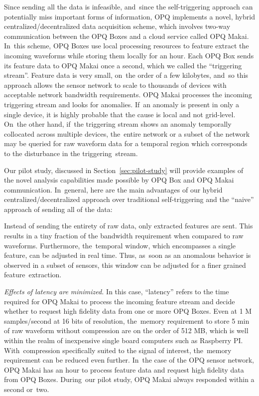 \documentclass[energies,article,accept,moreauthors,pdftex]{Definitions/mdpi}
\begin{document}
Since sending all the data is infeasible, and~since the self-triggering approach can potentially miss important forms of information, OPQ implements a novel, hybrid centralized/decentralized data acquisition scheme, which involves two-way communication between the OPQ Boxes and a cloud service called OPQ Makai. In~this scheme, OPQ Boxes use local processing resources to feature extract the incoming waveforms while storing them locally for an hour. Each OPQ Box sends its feature data to OPQ Makai once a second, which we called the ``triggering stream''. Feature data is very small, on~the order of a few kilobytes, and~so this approach allows the sensor network to scale to thousands of devices with acceptable network bandwidth requirements. OPQ Makai processes the incoming triggering stream and looks for anomalies. If~an anomaly is present in only a single device, it is highly probable that the cause is local and not grid-level. On~the other hand, if~the triggering stream shows an anomaly temporally collocated across multiple devices, the~entire network or a subset of the network may be queried for raw waveform data for a temporal region which corresponds to the disturbance in the triggering~stream.

Our pilot study, discussed in Section~\ref{sec:pilot-study} will provide examples of the novel analysis capabilities made possible by OPQ Box and OPQ Makai communication. In~general, here are the main advantages of our hybrid centralized/decentralized approach over traditional self-triggering and the ``naive'' approach of sending all of the data:

 Instead of sending the entirety of raw data, only extracted features are sent. This results in a tiny fraction of the bandwidth requirement when compared to raw waveforms. Furthermore, the~temporal window, which encompasses a single feature, can be adjusted in real time. Thus, as~soon as an anomalous behavior is observed in a subset of sensors, this window can be adjusted for a finer grained feature~extraction.

{\em Effects of latency are minimized.} In this case, ``latency'' refers to the time required for OPQ Makai to process the incoming feature stream and decide whether to request high fidelity data from one or more OPQ Boxes. Even at 1 M samples/second at 16 bits of resolution, the~memory requirement to store 5 min of raw waveform without compression are on the order of 512 MB, which is well within the realm of inexpensive single board computers such as Raspberry PI. With~compression specifically suited to the signal of interest, the~memory requirement can be reduced even further. In~the case of the OPQ sensor network, OPQ Makai has an hour to process feature data and request high fidelity data from OPQ Boxes. During~our pilot study, OPQ Makai always responded within a second or~two.
\end{document}

